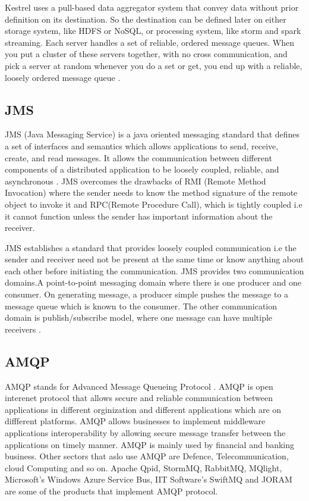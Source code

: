      Kestrel uses a pull-based data aggregator system that convey data
     without prior definition on its destination. So the destination
     can be defined later on either storage system, like HDFS or
     NoSQL, or processing system, like storm and spark
     streaming. Each server handles a set of reliable, ordered message
     queues. When you put a cluster of these servers together, with no
     cross communication, and pick a server at random whenever you do
     a set or get, you end up with a reliable, loosely ordered message
     queue \cite{git-kestrel}.

\subsection{JMS}

     JMS (Java Messaging Service) is a java oriented messaging
     standard that defines a set of interfaces and semantics which
     allows applications to send, receive, create, and read messages.
     It allows the communication between different components of a
     distributed application to be loosely coupled, reliable, and
     asynchronous \cite{www-jms-wiki}. JMS overcomes the drawbacks of
     RMI (Remote Method Invocation) where the sender needs to know the
     method signature of the remote object to invoke it and RPC(Remote
     Procedure Call), which is tightly coupled i.e it cannot function
     unless the sender has important information about the receiver.

     JMS establishes a standard that provides loosely coupled
     communication i.e the sender and receiver need not be present at
     the same time or know anything about each other before initiating
     the communication.  JMS provides two communication domains.A
     point-to-point messaging domain where there is one producer and
     one consumer. On generating message, a producer simple pushes the
     message to a message queue which is known to the consumer. The
     other communication domain is publish/subscribe model, where one
     message can have multiple receivers \cite{www-jms-oracle-docs}.

\subsection{AMQP}

     AMQP stands for Advanced Message Queueing
     Protocol \cite{www-amqp}. AMQP is open interenet protocol that allows secure and
     reliable communication between applications in different
     orginization and different applications which are on diffferent
     platforms. AMQP allows businesses to implement middleware
     applications interoperability by allowing secure message transfer
     between the applications on timely manner. AMQP is mainly used by
     financial and banking business. Other sectors that aslo use AMQP
     are Defence, Telecommunication, cloud Computing and so on.
     Apache Qpid, StormMQ, RabbitMQ, MQlight, Microsoft's Windows
     Azure Service Bus, IIT Software's SwiftMQ and JORAM are some of
     the products that implement AMQP protocol.

